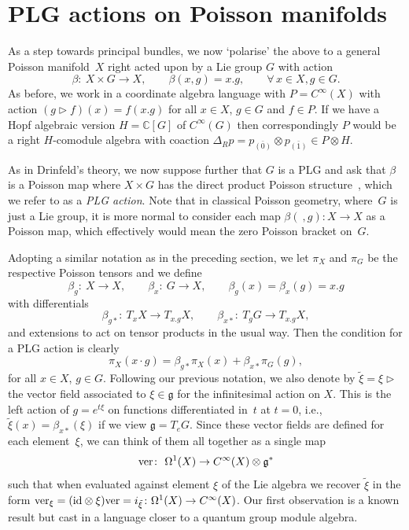 \documentclass[10pt,a4paper]{amsart}
\numberwithin{equation}{section}
\newcommand{\C}{{\mathbb{C}}}
\newcommand{\<}{{\langle}}
\renewcommand{\>}{{\rangle}}
\newcommand{\tens}{\otimes}
\newcommand{\id}{{\rm id}}
\newcommand{\co}{{}_{\scriptstyle \bar{(1)}}}
\newcommand{\rz}{{}_{\scriptstyle \bar{(0)}}}
\newcommand{\la}{{\triangleright}}
\newcommand{\cg}{{\mathfrak{g}}}
\newcommand{\ver}{{\rm ver}}
\begin{document}
\section{PLG actions on Poisson manifolds}\label{PLGact}

As a step towards principal bundles, we now `polarise' the above to a general Poisson mani\-fold~$X$ right acted upon by a Lie group $G$ with action
\[ \beta\colon \ X\times G\to X,\qquad \beta(x,g)=x.g,\qquad\forall\, x\in X, g\in G.\]
As before, we work in a coordinate algebra language with $P=C^\infty(X)$ with action $(g\la f)(x)=f(x.g)$ for all $x\in X$, $g\in G$ and $f\in P$. If we have a Hopf algebraic version $H=\C[G]$ of $C^\infty(G)$ then correspondingly $P$ would be a right $H$-comodule algebra with coaction $\Delta_Rp=p\rz\tens p\co\in P\tens H$.

As in Drinfeld's theory, we now suppose further that $G$ is a PLG and ask that $\beta$ is a Poisson map where $X\times G$ has the direct product Poisson structure~\cite{Lu}, which we refer to as a {\em PLG action}. Note that in classical Poisson geometry, where~$G$ is just a Lie group, it is more normal to consider each map $\beta(\ ,g)\colon X\to X$ as a Poisson map, which effectively would mean the zero Poisson bracket on~$G$.

Adopting a similar notation as in the preceding section, we let $\pi_X$ and $\pi_G$ be the respective Poisson tensors and we define
\[ \beta_g\colon \ X\to X,\qquad \beta_x\colon \ G\to X,\qquad \beta_g(x)=\beta_x(g)=x.g\]
with differentials
\[ \beta_{g*}\colon \ T_xX\rightarrow T_{x.g}X, \qquad \beta_{x*}\colon \ T_gG\rightarrow T_{x.g}X, \]
and extensions to act on tensor products in the usual way. Then the condition for a PLG action is clearly
\begin{equation*}%
\pi_X(x\cdot g)=\beta_{g*}\pi_X(x)+\beta_{x*}\pi_G(g), \end{equation*}
for all $x\in X$, $g\in G$. Following our previous notation, we also denote by $\tilde\xi=\xi\la$ the vector field associated to $\xi\in\cg$ for the infinitesimal action on $X$. This is the left action of $g=e^{t\xi}$ on functions differentiated in~$t$ at $t=0$, i.e., $\tilde\xi(x)=\beta_{x*}(\xi)$ if we view $\cg=T_eG$. Since these vector fields are defined for each element~$\xi$, we can think of them all together as a single map
\begin{equation*}%
\ver\colon \ \Omega^1(X)\rightarrow C^{\infty}(X)\tens\mathfrak{g}^*\end{equation*} such that when evaluated against element $\xi$ of the Lie algebra we recover $\tilde\xi$ in the form $\ver_\xi=(\id\tens\xi)\ver=i_{\tilde\xi}\colon \Omega^1(X)\to C^\infty(X)$. Our first observation is a known result but cast in a language closer to a quantum group module algebra.
\end{document}
